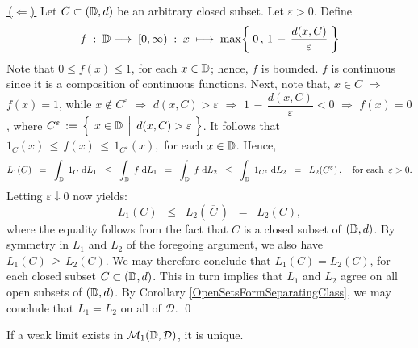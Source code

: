 \vskip 0.5cm
\noindent
\underline{\,($\Longleftarrow$)\,}\;\;
Let $C \subset (\mathbb{D},d)$ be an arbitrary closed subset.
Let $\varepsilon > 0$. Define 
\begin{equation*}
f
\; : \; \mathbb{D} \longrightarrow \; [0,\infty) \; : \;
x \; \longmapsto\;  \max\!\left\{\; 0\,,\, 1\,-\,\dfrac{d(x,C)}{\varepsilon} \;\right\}
\end{equation*}
Note that $0 \leq f(x) \leq 1$, for each $x \in \mathbb{D}$; hence, $f$ is bounded.
$f$ is continuous since it is a composition of continuous functions.
Next, note that, $x \in C$ $\Longrightarrow$ $f(x) = 1$, while 
$x \notin C^{\varepsilon}$
\;$\Longrightarrow$\; $d(x,C) > \varepsilon$
\;$\Longrightarrow$\; $1\,-\,\dfrac{d(x,C)}{\varepsilon} < 0$
\;$\Longrightarrow$\; $f(x) = 0$,
where $C^{\varepsilon} \,:=\, \left\{\;\left.x \overset{{\color{white}.}}{\in} \D \;\,\right\vert\; d(x,C) > \varepsilon\;\right\}$.
It follows that \,$1_{C}(x) \,\leq\, f(x) \,\leq\, 1_{C^{\varepsilon}}(x)$,\, for each $x\in\mathbb{D}$.
Hence,
\begin{equation*}
L_{1}(C)
\;\; = \;\;
	\int_{\mathbb{D}}\;1_{C}\;\textnormal{d} L_{1}
\;\; \leq \;\;
	\int_{\mathbb{D}}\;f\;\textnormal{d} L_{1}
\;\; = \;\;
	\int_{\mathbb{D}}\;f\;\textnormal{d} L_{2}
\;\; \leq \;\;
	\int_{\mathbb{D}}\;1_{C^{\varepsilon}}\;\textnormal{d} L_{2}
\;\; = \;\;
	L_{2}(C^{\varepsilon})\,,
	\quad
	\textnormal{for each \,$\varepsilon > 0$}.
\end{equation*}
Letting $\varepsilon \downarrow 0$ now yields:
\begin{equation*}
L_{1}(C) \;\; \leq \;\; L_{2}\!\left(\,\overline{C}\,\right) \;\; = \;\; L_{2}(C),
\end{equation*}
where the equality follows from the fact that $C$ is a closed subset of $(\mathbb{D},d)$.
By symmetry in $L_{1}$ and $L_{2}$ of the foregoing argument,
we also have $L_{1}(C) \,\geq\, L_{2}(C)$.
We may therefore conclude that $L_{1}(C) = L_{2}(C)$,
for each closed subset $C \subset (\mathbb{D},d)$.
This in turn implies that $L_{1}$ and $L_{2}$ agree on all open subsets of $(\mathbb{D},d)$.
By Corollary \ref{OpenSetsFormSeparatingClass},
we may conclude that $L_{1} = L_{2}$ on all of $\mathcal{D}$.
\qed

\begin{corollary}\quad
If a weak limit exists in $\mathcal{M}_{1}(\mathbb{D},\mathcal{D})$, it is unique.
\end{corollary}


\renewcommand{\theenumi}{\roman{enumi}}
\renewcommand{\labelenumi}{\textnormal{(\theenumi)}$\;\;$}

